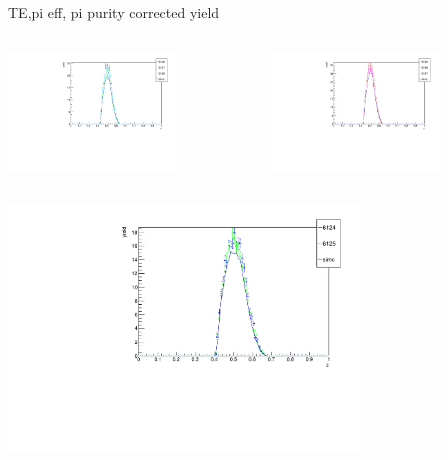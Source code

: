 \begin{frame}{TE,pi eff, pi purity corrected yield}
\begin{columns}
\begin{column}[T]{0.5\textwidth}
\includegraphics[width = 0.7\textwidth]{results/yield/check/yieldcheck_140_neg.pdf}
\end{column}
\begin{column}[T]{0.5\textwidth}
\includegraphics[width = 0.7\textwidth]{results/yield/check/yieldcheck_140_pos.pdf}
\end{column}
\end{columns}
\begin{columns}
\begin{column}[T]{0.5\textwidth}
\includegraphics[width = 0.7\textwidth]{results/yield/check/yieldcheck_130_neg.pdf}

\end{column}
\end{columns}
\end{frame}

